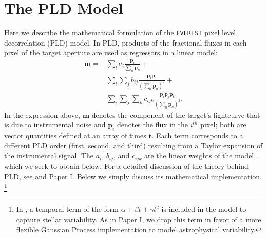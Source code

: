 \documentclass[]{aastex62}
\newcommand{\edited}[1]{{\color{red} #1}}
\begin{document}
\section{The PLD Model}
\label{sec:model}
Here we describe the mathematical formulation of the \texttt{EVEREST}
pixel level decorrelation (PLD) model. In PLD, products of the fractional fluxes in each pixel
of the target aperture are used as regressors in a linear model:
%
\begin{align}
\label{eq:pldmodel}
\mathbf{m} = &\sum\limits_{i}                                 a_i     \frac{\mathbf{p}_{i}}                             { \sum\limits_{n}\mathbf{p}_{n}} +     \nonumber\\
             &\sum\limits_{i} \sum\limits_{j}                 b_{ij}  \frac{\mathbf{p}_{i}\mathbf{p}_{j}}               {(\sum\limits_{n}\mathbf{p}_{n})^2} +  \nonumber\\
             &\sum\limits_{i} \sum\limits_{j} \sum\limits_{k} c_{ijk} \frac{\mathbf{p}_{i}\mathbf{p}_{j}\mathbf{p}_{k}} {(\sum\limits_{n}\mathbf{p}_{n})^3}.
\end{align}
%
In the expression above, $\mathbf{m}$ \edited{denotes the component of the target's
lightcurve that is due to instrumental noise}
and $\mathbf{p}_{i}$ denotes the flux in
the $i^{th}$ pixel; both are vector quantities defined at an array of times $\mathbf{t}$.
Each term corresponds to a different PLD order (first, second, and third) resulting from
a Taylor expansion of the instrumental signal.
The $a_i$, $b_{ij}$, and $c_{ijk}$ are the linear weights of the model, which we seek
to obtain below. For a detailed discussion of the theory behind PLD, see
\cite{Deming15} and Paper I. Below we simply discuss its mathematical implementation.
\footnote{\edited{In \citet{Deming15},
a temporal term of the form $\alpha + \beta t + \gamma t^2$ is included in the model
to capture stellar variability. As in Paper I, we drop this term in favor of
a more flexible Gaussian Process implementation to model astrophysical variability.}}
\end{document}

